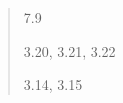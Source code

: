 \documentclass[12pt]{extarticle}
\begin{document}
\begin{multicols*}{3}
\begin{minipage}{\columnwidth}
\begin{quote}
7.9
 
3.20, 3.21, 3.22
 
3.14, 3.15
 
\end{quote}
\end{minipage}


 


\end{multicols*}
\end{document}
